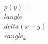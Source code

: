 \documentclass[preview]{standalone}
\begin{document}
\begin{align*}
p(y) = \\langle \\delta(x-y) \\rangle_x
\end{align*}
\end{document}
